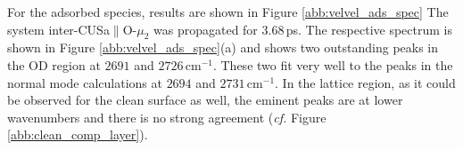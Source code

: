 \documentclass[11pt,DIV=13,BCOR=5mm,a4paper,headinclude]{scrbook}
\begin{document}
For the adsorbed species, results are shown in Figure \ref{abb:velvel_ads_spec}
The system inter-CUSa$\parallel$O-$\mu_2$ was propagated for $3.68\,$ps.
The respective spectrum is shown in Figure \ref{abb:velvel_ads_spec}(a) and shows two outstanding peaks in the OD region at $2691$ and $2726\,$cm$^{-1}$.
These two fit very well to the peaks in the normal mode calculations at $2694$ and $2731\,$cm$^{-1}$.
In the lattice region, as it could be observed for the clean surface as well, the eminent peaks are at lower wavenumbers and there is no strong agreement (\textit{cf.} Figure \ref{abb:clean_comp_layer}).
\begin{figure}[!h]
    \centering

\end{figure}
\end{document}
